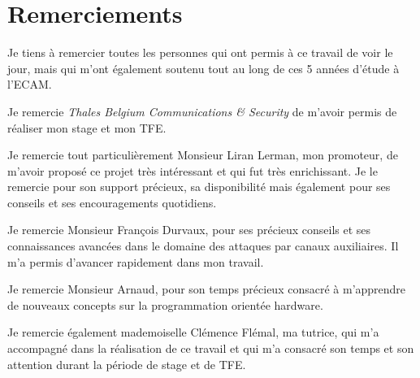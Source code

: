 \documentclass[oneside]{book}
\begin{document}
\newpage
\strut
\thispagestyle{empty}
\newpage



\chapter*{Remerciements}

Je tiens à remercier toutes les personnes qui ont permis à ce travail de voir le jour, mais qui m’ont également soutenu tout au long de ces 5 années d’étude à l’ECAM.

Je remercie \textit{Thales Belgium Communications \& Security} de m’avoir permis de réaliser mon stage et mon TFE.

Je remercie tout particulièrement Monsieur Liran Lerman, mon promoteur, de m’avoir proposé ce projet très intéressant et qui fut très enrichissant. Je le remercie pour son support précieux, sa disponibilité mais également pour ses conseils et ses encouragements quotidiens.

Je remercie Monsieur François Durvaux, pour ses précieux conseils et ses connaissances avancées dans le domaine des attaques par canaux auxiliaires. Il m'a permis d'avancer rapidement dans mon travail.

Je remercie Monsieur Arnaud, pour son temps précieux consacré à m'apprendre de nouveaux concepts sur la programmation orientée hardware. 

Je remercie également mademoiselle Clémence Flémal, ma tutrice, qui m’a accompagné dans la réalisation de ce travail et qui m’a consacré son temps et son attention durant la période de stage et de TFE.

\newpage


{} %

\newpage

\end{document}
